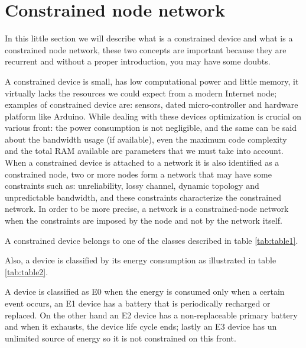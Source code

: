 	\section{Constrained node network}
	In this little section we will describe what is a constrained device and what is a constrained node network,
	these two concepts are important because they are recurrent and without a proper introduction, you may have
	some doubts. \newline
	
	A constrained device is small, has low computational power and little memory, it virtually lacks the resources
	we could expect from a modern Internet node; examples of constrained device are: sensors, dated micro-controller and hardware platform like Arduino.\newline
	While dealing with these devices optimization is crucial on various front: the power consumption is not negligible,
	and the same can be said about the bandwidth usage (if available), even the maximum code complexity and the total RAM available are parameters that we must take into account.\newline
	When a constrained device is attached to a network it is also identified as a constrained node, two or more nodes form a network that may have some constraints such as: unreliability, lossy channel, dynamic topology and unpredictable bandwidth, and these constraints characterize the constrained network.\newline
	In order to be more precise, a network is a constrained-node network when the constraints are imposed by the node
	and not by the network itself.
	
	
	
	A constrained device belongs to one of the classes described in table \ref{tab:table1}.\newline
	
	
	Also, a device is classified by its energy consumption as illustrated in table \ref{tab:table2}.
	
	A device is classified as E0 when the energy is consumed only when a certain event occurs, an E1 device has a battery 
	that is periodically recharged or replaced.\newline
	On the other hand an E2 device has a non-replaceable primary battery and when it exhausts, the device life cycle ends; lastly an E3 device has un unlimited source of energy so it is not constrained on this front.\newline 
	
